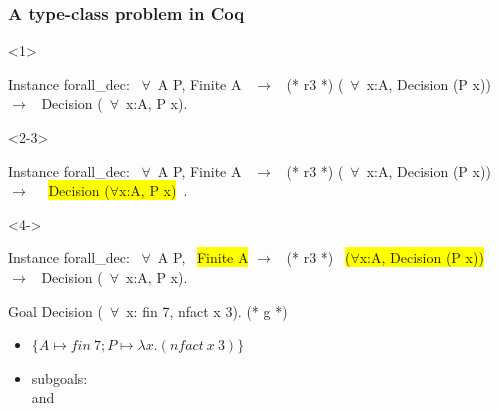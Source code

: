 \documentclass{pres}
\begin{document}
\begin{frame}[fragile]
  \frametitle{A type-class problem in Coq}

  \begin{onlyenv}<1>
    \begin{coqcode}
      Instance forall_dec: ~$\forall$~A P, Finite A ~$\to$~            (* r3 *)
        (~$\forall$~x:A, Decision (P x)) ~$\to$~ Decision (~$\forall$~x:A, P x).
    \end{coqcode}
  \end{onlyenv}

  \begin{onlyenv}<2-3>
    \begin{coqcode}
      Instance forall_dec: ~$\forall$~A P, Finite A ~$\to$~            (* r3 *)
        (~$\forall$~x:A, Decision (P x)) ~$\to$~ ~\colorbox{yellow}{Decision ($\forall$x:A, P x)}~.
    \end{coqcode}
  \end{onlyenv}

  \begin{onlyenv}<4->
    \begin{coqcode}
      Instance forall_dec: ~$\forall$~A P, ~\colorbox{yellow}{Finite A} $\to$~           (* r3 *)
        ~\colorbox{yellow}{($\forall$x:A, Decision (P x))}~ ~$\to$~ Decision (~$\forall$~x:A, P x).
    \end{coqcode}
  \end{onlyenv}

  \mysep{}

  \begin{coqcode}
    Goal Decision (~$\forall$~x: fin 7, nfact x 3).             (* g *)
  \end{coqcode}

  \begin{itemize}
    \item<2-> $\{A \mapsto fin\ 7; P \mapsto \lambda x.(nfact\ x\ 3)\}$
    \item<4> subgoals:\\
       and 
  \end{itemize}


\end{frame}
\end{document}
